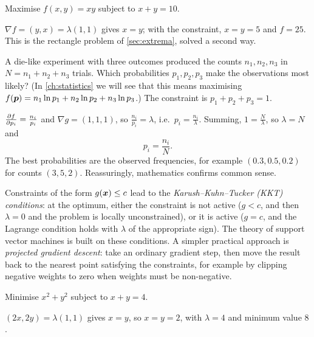 \begin{example}
Maximise $f(x, y) = xy$ subject to $x + y = 10$.

\sol $\nabla f = (y, x) = \lambda(1, 1)$ gives $x = y$; with the constraint,
$x = y = 5$ and $f = 25$. This is the rectangle problem of \cref{sec:extrema},
solved a second way.
\end{example}

\begin{example}\label{ex:lagrange-categorical}
A die-like experiment with three outcomes produced the counts $n_1, n_2, n_3$ in
$N = n_1 + n_2 + n_3$ trials. Which probabilities $p_1, p_2, p_3$ make the
observations most likely? (In \cref{ch:statistics} we will see that this means
maximising $f(\bm{p}) = n_1\ln p_1 + n_2\ln p_2 + n_3\ln p_3$.) The constraint is
$p_1 + p_2 + p_3 = 1$.

\sol $\frac{\partial f}{\partial p_i} = \frac{n_i}{p_i}$ and $\nabla g = (1, 1, 1)$, so
$\frac{n_i}{p_i} = \lambda$, i.e.\ $p_i = \frac{n_i}{\lambda}$. Summing,
$1 = \frac{N}{\lambda}$, so $\lambda = N$ and
\[
  p_i = \frac{n_i}{N}.
\]
The best probabilities are the observed frequencies, for example
$(0.3, 0.5, 0.2)$ for counts $(3, 5, 2)$. Reassuringly, mathematics confirms
common sense.
\end{example}

\begin{remark}
Constraints of the form $g(\bm{x}) \le c$ lead to the
\emph{Karush--Kuhn--Tucker (KKT) conditions}: at the optimum, either the
constraint is not active ($g < c$, and then $\lambda = 0$ and the problem is
locally unconstrained), or it is active ($g = c$, and the Lagrange condition
holds with $\lambda$ of the appropriate sign). The theory of support vector
machines is built on these conditions. A simpler practical approach is
\emph{projected gradient descent}: take an ordinary gradient step, then move the
result back to the nearest point satisfying the constraints, for example by
clipping negative weights to zero when weights must be non-negative.
\end{remark}

\sectionexercises

\begin{exercise}
Minimise $x^2 + y^2$ subject to $x + y = 4$.
\end{exercise}
\begin{solution}
$(2x, 2y) = \lambda(1, 1)$ gives $x = y$, so $x = y = 2$, with $\lambda = 4$ and
minimum value $8$.
\end{solution}

